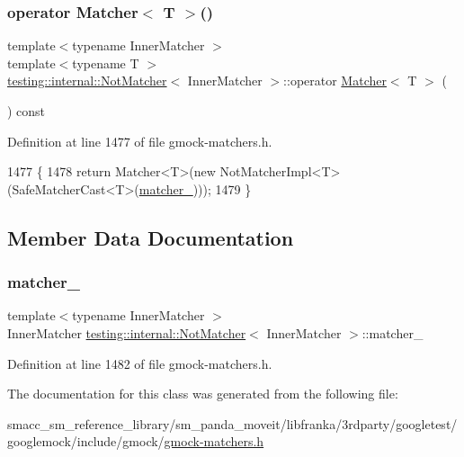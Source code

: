 \subsubsection{\texorpdfstring{operator Matcher$<$ T $>$()}{operator Matcher< T >()}}
{\footnotesize\ttfamily template$<$typename Inner\+Matcher $>$ \\
template$<$typename T $>$ \\
\hyperlink{classtesting_1_1internal_1_1NotMatcher}{testing\+::internal\+::\+Not\+Matcher}$<$ Inner\+Matcher $>$\+::operator \hyperlink{classtesting_1_1Matcher}{Matcher}$<$ T $>$ (\begin{DoxyParamCaption}{ }\end{DoxyParamCaption}) const\hspace{0.3cm}{\ttfamily [inline]}}



Definition at line 1477 of file gmock-\/matchers.\+h.


\begin{DoxyCode}
1477                               \{
1478     \textcolor{keywordflow}{return} Matcher<T>(\textcolor{keyword}{new} NotMatcherImpl<T>(SafeMatcherCast<T>(\hyperlink{classtesting_1_1internal_1_1NotMatcher_aa6b7d0db2877713a05451b0f8a8c1241}{matcher\_})));
1479   \}
\end{DoxyCode}


\subsection{Member Data Documentation}
\mbox{\label{classtesting_1_1internal_1_1NotMatcher_aa6b7d0db2877713a05451b0f8a8c1241}} 
\subsubsection{\texorpdfstring{matcher\+\_\+}{matcher\_}}
{\footnotesize\ttfamily template$<$typename Inner\+Matcher $>$ \\
Inner\+Matcher \hyperlink{classtesting_1_1internal_1_1NotMatcher}{testing\+::internal\+::\+Not\+Matcher}$<$ Inner\+Matcher $>$\+::matcher\+\_\+\hspace{0.3cm}{\ttfamily [private]}}



Definition at line 1482 of file gmock-\/matchers.\+h.



The documentation for this class was generated from the following file\+:\begin{DoxyCompactItemize}
\item 
smacc\+\_\+sm\+\_\+reference\+\_\+library/sm\+\_\+panda\+\_\+moveit/libfranka/3rdparty/googletest/googlemock/include/gmock/\hyperlink{gmock-matchers_8h}{gmock-\/matchers.\+h}\end{DoxyCompactItemize}
